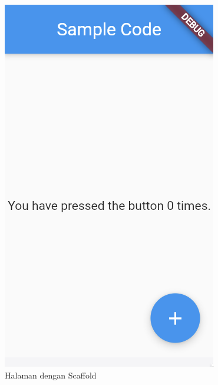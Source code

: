\begin{enumerate}
	\begin{figure}[H]
		\centering
		\hspace{.15\linewidth}
		  \includegraphics[width=\linewidth]{gambar/scaffold.png}
		  \caption{Halaman dengan Scaffold}
		\endminipage\hfill

\end{figure}
\end{enumerate}
